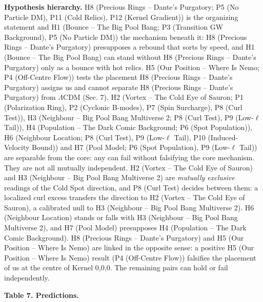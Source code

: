 \documentclass[
  11pt,
]{article}
\begin{document}
\textbf{Hypothesis hierarchy.} H8 (Precious Rings -- Dante's Purgatory;
P5 (No Particle DM), P11 (Cold Relics), P12 (Kernel Gradient)) is the
organizing statement and H1 (Bounce -- The Big Pool Bang; P3 (Transition
GW Background), P5 (No Particle DM)) the mechanism beneath it: H8
(Precious Rings -- Dante's Purgatory) presupposes a rebound that sorts
by speed, and H1 (Bounce -- The Big Pool Bang) can stand without H8
(Precious Rings -- Dante's Purgatory) only as a bounce with hot relics.
H5 (Our Position -- Where Is Nemo; P4 (Off-Centre Flow)) tests the
placement H8 (Precious Rings -- Dante's Purgatory) assigns us and cannot
separate H8 (Precious Rings -- Dante's Purgatory) from \(\Lambda\)CDM
(Sec. 7). H2 (Vortex -- The Cold Eye of Sauron; P1 (Polarization Ring),
P2 (Cyclonic B-modes), P7 (Spin Surcharge), P8 (Curl Test)), H3
(Neighbour -- Big Pool Bang Multiverse 2; P8 (Curl Test), P9
(Low-\(\ell\) Tail)), H4 (Population -- The Dark Comic Background; P6
(Spot Population)), H6 (Neighbour Location; P8 (Curl Test), P9
(Low-\(\ell\) Tail), P10 (Induced-Velocity Bound)) and H7 (Pool Model;
P6 (Spot Population), P9 (Low-\(\ell\) Tail)) are separable from the
core: any can fail without falsifying the core mechanism. They are not
all mutually independent. H2 (Vortex -- The Cold Eye of Sauron) and H3
(Neighbour -- Big Pool Bang Multiverse 2) are \emph{mutually exclusive}
readings of the Cold Spot direction, and P8 (Curl Test) decides between
them: a localized curl excess transfers the direction to H2 (Vortex --
The Cold Eye of Sauron), a calibrated null to H3 (Neighbour -- Big Pool
Bang Multiverse 2). H6 (Neighbour Location) stands or falls with H3
(Neighbour -- Big Pool Bang Multiverse 2), and H7 (Pool Model)
presupposes H4 (Population -- The Dark Comic Background). H8 (Precious
Rings -- Dante's Purgatory) and H5 (Our Position -- Where Is Nemo) are
linked in the opposite sense: a positive H5 (Our Position -- Where Is
Nemo) result (P4 (Off-Centre Flow)) falsifies the placement of us at the
centre of Kernel 0,0,0. The remaining pairs can hold or fail
independently.

\textbf{Table 7. Predictions.}
\end{document}
